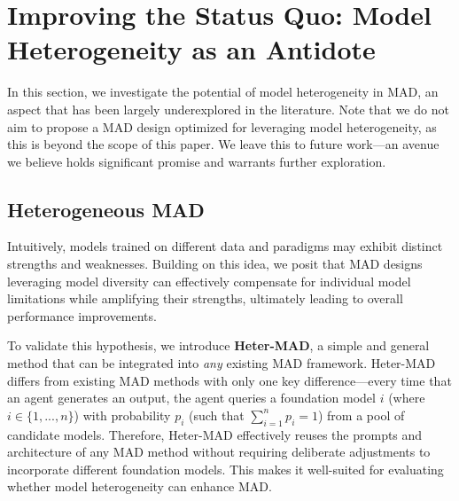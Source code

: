 
\section{Improving the Status Quo: Model Heterogeneity as an Antidote} %
In this section, we investigate the potential of model heterogeneity in MAD, an aspect that has been largely underexplored in the literature. 
Note that we do not aim to propose a MAD design optimized for leveraging model heterogeneity, as this is beyond the scope of this paper. We leave this to future work---an avenue we believe holds significant promise and warrants further exploration.
\subsection{Heterogeneous MAD}
Intuitively, models trained on different data and paradigms may exhibit distinct strengths and weaknesses. Building on this idea, we posit that MAD designs leveraging model diversity can effectively compensate for individual model limitations while amplifying their strengths, ultimately leading to overall performance improvements.

To validate this hypothesis, we introduce \textbf{Heter-MAD}, a simple and general method that can be integrated into \emph{any} existing MAD framework. 
Heter-MAD differs from existing MAD methods with only one key difference---every time that an agent generates an output, the agent queries a foundation model $i$ (where $i\in \{1,..., n\}$) with probability $p_i$ (such that $\sum_{i=1}^n p_i =1$) from a pool of candidate models. 
Therefore, Heter-MAD effectively reuses the prompts and architecture of any MAD method without requiring deliberate adjustments to incorporate different foundation models. 
This makes it well-suited for evaluating whether model heterogeneity can enhance MAD.

